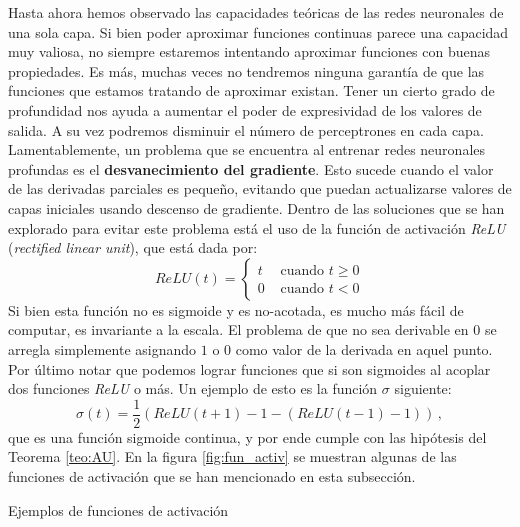 \documentclass[letterpaper,11pt]{article} %
\theoremstyle{defbreak}
\theoremstyle{propbreak}
\theoremstyle{remark}
\theoremstyle{break}
\begin{document}
Hasta ahora hemos observado las capacidades teóricas de las redes neuronales de una sola capa. Si bien poder aproximar funciones continuas parece una capacidad muy valiosa, no siempre estaremos intentando aproximar funciones con buenas propiedades. Es más, muchas veces no tendremos ninguna garantía de que las funciones que estamos tratando de aproximar existan. Tener un cierto grado de profundidad nos ayuda a aumentar el poder de expresividad de los valores de salida. A su vez podremos disminuir el número de perceptrones en cada capa.
\newp Lamentablemente, un problema que se encuentra al entrenar redes neuronales profundas es el \textbf{desvanecimiento del gradiente}. Esto sucede cuando el valor de las derivadas parciales es pequeño, evitando que puedan actualizarse valores de capas iniciales usando descenso de gradiente. Dentro de las soluciones que se han explorado para evitar este problema está el uso de la función de activación \textit{ReLU} (\textit{rectified linear unit}), que está dada por:
$$ ReLU(t) = \begin{cases}
t & \text{ cuando }t\geq0 \\
0 & \text{ cuando }t<0
\end{cases}$$
Si bien esta función no es sigmoide y es no-acotada, es mucho más fácil de computar, es invariante a la escala. El problema de que no sea derivable en $0$ se arregla simplemente asignando $1$ o $0$ como valor de la derivada en aquel punto. Por último notar que podemos lograr funciones que si son sigmoides al acoplar dos funciones \textit{ReLU} o más. Un ejemplo de esto es la función $\sigma$ siguiente:
$$ \sigma(t) = \frac{1}{2}(ReLU(t+1)-1-(ReLU(t-1)-1))\,,$$
que es una función sigmoide continua, y por ende cumple con las hipótesis del Teorema \ref{teo:AU}. En la figura \ref{fig:fun_activ} se muestran algunas de las funciones de activación que se han mencionado en esta subsección.
\begin{images}[\label{fig:fun_activ}]{Ejemplos de funciones de activación}
	\imagesnewline
\end{images}
\end{document}

